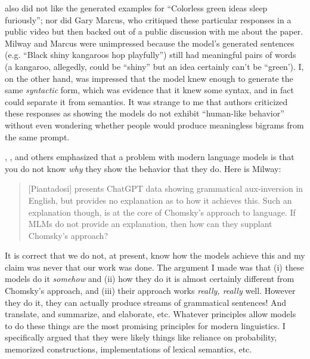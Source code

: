 \documentclass[output=paper,colorlinks,citecolor=brown
]{langscibook}
\begin{document}
\cite{milway2023response} also did not like the generated examples for ``Colorless green ideas sleep furiously''; nor did Gary Marcus, who critiqued these particular responses in a public video but then backed out of a public discussion with me about the paper. Milway and Marcus were unimpressed because the model's generated sentences (e.g. ``Black shiny kangaroos hop playfully'') still had meaningful pairs of words (a kangaroo, allegedly, could be ``shiny'' but an idea certainly can't be ``green'). I, on the other hand, was impressed that the model knew enough to generate the same \emph{syntactic} form, which was evidence that it knew some syntax, and in fact could separate it from semantics. It was strange to me that authors criticized these responses as showing the models do not exhibit ``human-like behavior'' without even wondering whether people would produce meaningless bigrams from the same prompt.


\cite{milway2023response}, \cite{kodner2023linguistics}, and others emphasized that a problem with modern language models is that you do not know \emph{why} they show the behavior that they do. Here is Milway:
\begin{quote}
[Piantadosi] presents ChatGPT data showing grammatical aux-inversion in English, but provides no explanation as to how it achieves this. Such an explanation though, is at the core of Chomsky’s approach to language. If MLMs do not provide an explanation, then how can they supplant Chomsky’s approach?
\end{quote}
It is correct that we do not, at present, know how the models achieve this and my claim was never that our work was done. The argument I made was that (i) these models do it \emph{somehow} and (ii) how they do it is almost certainly different from Chomsky's approach, and (iii) their approach works \emph{really, really} well. However they do it, they can actually produce streams of grammatical sentences! And translate, and summarize, and elaborate, etc. Whatever principles allow models to do these things are the most promising principles for modern linguistics. I specifically argued that they were likely things like reliance on probability, memorized constructions, implementations of lexical semantics, etc. 
\end{document}
